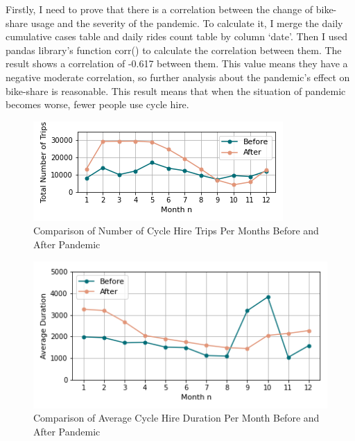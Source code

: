 \documentclass[11pt,a4paper]{article}
\begin{document}
Firstly, I need to prove that there is a correlation between the change of bike-share usage and the severity of the pandemic. To calculate it, I merge the daily cumulative cases table and daily rides count table by column ‘date’. Then I used pandas library’s function corr() to calculate the correlation between them. The result shows a correlation of -0.617 between them. This value means they have a negative moderate correlation, so further analysis about the pandemic’s effect on bike-share is reasonable. This result means that when the situation of pandemic becomes worse, fewer people use cycle hire.

\begin{figure}[ht!]
  \centering
  \includegraphics{ridesFigure.png}
  \caption{Comparison of Number of Cycle Hire Trips Per Months Before and After Pandemic}
  \label{fds-project-template:fig:ridesFigure}
\end{figure}

\begin{figure}[ht!]
  \centering
  \includegraphics{durationFigure.png}
  \caption{Comparison of Average Cycle Hire Duration Per Month Before and After Pandemic}
  \label{fds-project-template:fig:durationFigure}
\end{figure}
\end{document}
